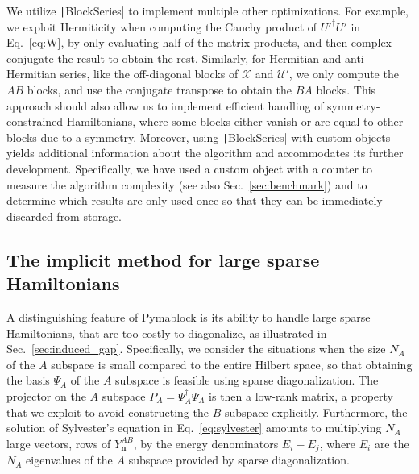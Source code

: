 We utilize \texttt|BlockSeries| to implement multiple other optimizations.
For example, we exploit Hermiticity when computing the Cauchy product of $U'^{\dagger}U'$ in Eq.~\eqref{eq:W}, by only evaluating half of the matrix products, and then complex conjugate the result to obtain the rest.
Similarly, for Hermitian and anti-Hermitian series, like the off-diagonal blocks of $\mathcal{X}$ and $\mathcal{U}'$, we only compute the $AB$ blocks, and use the conjugate transpose to obtain the $BA$ blocks.
This approach should also allow us to implement efficient handling of symmetry-constrained Hamiltonians, where some blocks either vanish or are equal to other blocks due to a symmetry.
Moreover, using \texttt|BlockSeries| with custom objects yields additional information about the algorithm and accommodates its further development.
Specifically, we have used a custom object with a counter to measure the algorithm complexity (see also Sec.~\ref{sec:benchmark}) and to determine which results are only used once so that they can be immediately discarded from storage.

\subsection{The implicit method for large sparse Hamiltonians}
\label{sec:implicit}

A distinguishing feature of Pymablock is its ability to handle large sparse Hamiltonians, that are too costly to diagonalize, as illustrated in Sec.~\ref{sec:induced_gap}.
Specifically, we consider the situations when the size $N_A$ of the $A$ subspace is small compared to the entire Hilbert space, so that obtaining the basis $\Psi_A$ of the $A$ subspace is feasible using sparse diagonalization.
The projector on the $A$ subspace $P_A = \Psi_A^\dagger \Psi_A$ is then a low-rank matrix, a property that we exploit to avoid constructing the $B$ subspace explicitly.
Furthermore, the solution of Sylvester's equation in Eq.~\ref{eq:sylvester} amounts to multiplying $N_A$ large vectors, rows of $Y_{\mathbf{n}}^{AB}$, by the energy denominators $E_i - E_j$, where $E_i$ are the $N_A$ eigenvalues of the $A$ subspace provided by sparse diagonalization.

